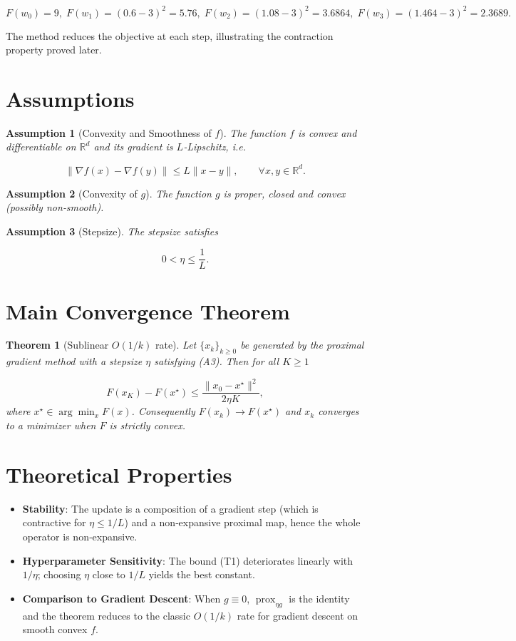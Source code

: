 \documentclass{article}
\newtheorem{theorem}{Theorem}
\newtheorem{assumption}{Assumption}
\newcommand{\prox}{\operatorname{prox}}
\newcommand{\R}{\mathbb{R}}
\begin{document}
\[
F(w_{0})=9,\;F(w_{1})=(0.6-3)^{2}=5.76,\;F(w_{2})=(1.08-3)^{2}=3.6864,\;F(w_{3})=(1.464-3)^{2}=2.3689.
\]

The method reduces the objective at each step, illustrating the contraction property proved later.

\newpage
\section*{Assumptions}
\begin{assumption}[Convexity and Smoothness of $f$]\label{as:f}
The function $f$ is convex and differentiable on $\R^{d}$ and its gradient is $L$‑Lipschitz, i.e.  

\[
\|\nabla f(x)-\nabla f(y)\| \le L\|x-y\|,\qquad\forall x,y\in\R^{d}.
\tag{A1}
\]
\end{assumption}

\begin{assumption}[Convexity of $g$]\label{as:g}
The function $g$ is proper, closed and convex (possibly non‑smooth).  
\end{assumption}

\begin{assumption}[Stepsize]\label{as:eta}
The stepsize satisfies  

\[
0<\eta\le \frac{1}{L}.
\tag{A3}
\]
\end{assumption}

\section*{Main Convergence Theorem}
\begin{theorem}[Sublinear $O(1/k)$ rate]\label{thm:rate}
Let $\{x_{k}\}_{k\ge0}$ be generated by the proximal gradient method with a stepsize $\eta$ satisfying (A3). Then for all $K\ge1$  

\[
F(x_{K})-F(x^{\star})\le \frac{\|x_{0}-x^{\star}\|^{2}}{2\eta K},
\tag{T1}
\]
where $x^{\star}\in\arg\min_{x}F(x)$. Consequently $F(x_{k})\to F(x^{\star})$ and $x_{k}$ converges to a minimizer when $F$ is strictly convex.
\end{theorem}

\section*{Theoretical Properties}
\begin{itemize}
    \item \textbf{Stability}: The update is a composition of a gradient step (which is contractive for $\eta\le 1/L$) and a non‑expansive proximal map, hence the whole operator is non‑expansive.
    \item \textbf{Hyperparameter Sensitivity}: The bound (T1) deteriorates linearly with $1/\eta$; choosing $\eta$ close to $1/L$ yields the best constant.
    \item \textbf{Comparison to Gradient Descent}: When $g\equiv0$, $\prox_{\eta g}$ is the identity and the theorem reduces to the classic $O(1/k)$ rate for gradient descent on smooth convex $f$.
\end{itemize}
\end{document}
